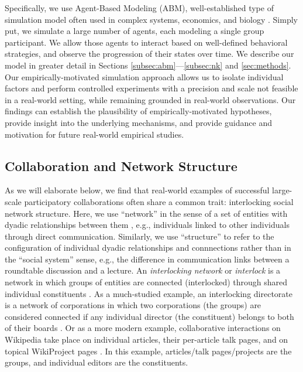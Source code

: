 \documentclass[manuscript,screen,review,acmsmall]{acmart}
\begin{document}
Specifically, we use Agent-Based Modeling (ABM),
well-established type of simulation model often used in complex systems,
economics, and biology
\cite{hong_groups_2004,
lazer_network_2007,
golub_naive_2010,
zollman_social_2012,
grim_scientific_2013,
barkoczi_social_2016,
gomez_clustering_2019}.
Simply put, we simulate a large number of agents, each modeling a single group participant.
We allow those agents to interact based on well-defined behavioral strategies,
and observe the progression of their states over time.
We describe our model in greater detail in
Sections \ref{subsec:abm}---\ref{subsec:nk} and \ref{sec:methods}.
Our empirically-motivated simulation approach allows us to isolate individual factors and perform controlled experiments with a precision and scale not feasible in a real-world setting, while remaining grounded in real-world observations.
Our findings can establish the plausibility of empirically-motivated hypotheses,
provide insight into the underlying mechanisms,
and provide guidance and motivation for future real-world empirical studies.

\subsection{Collaboration and Network Structure}
As we will elaborate below,
we find that real-world examples of successful large-scale participatory collaborations
often share a common trait:
interlocking social network structure.
Here, we use ``network'' in the sense of a set of entities with dyadic relationships between them \cite{newman_networks_2018}, e.g.,
individuals linked to other individuals through direct communication.
Similarly, we use ``structure'' to refer to the configuration of individual dyadic relationships and connnections rather than in the ``social system'' sense, e.g., the difference in communication links between a roundtable discussion and a lecture.
An {\em interlocking network} or {\em interlock}
is a network in which groups of entities are connected (interlocked)
through shared individual constituents \cite{taylor_world_2015}.
As a much-studied example,
an interlocking directorate is a network of corporations
in which two corporations (the groups) are considered connected if any individual director (the constituent) belongs to both of their boards 
\cite{mizruchi_what_1996}.
Or as a more modern example,
collaborative interactions on Wikipedia take place on individual articles, their per-article talk pages, and on topical WikiProject pages \cite{platt_network_2018}.
In this example, articles/talk pages/projects are the groups, and individual editors are the constituents.
\end{document}
